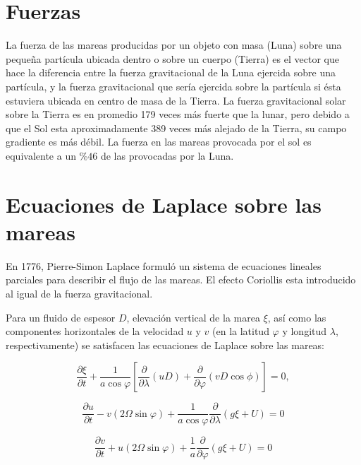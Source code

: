 \documentclass[12pt]{article}
\begin{document}
\section{Fuerzas}
La fuerza de las mareas producidas por un objeto con masa (Luna) sobre una pequeña partícula ubicada dentro o sobre un cuerpo (Tierra) es el vector que hace la diferencia entre la fuerza gravitacional de la Luna ejercida sobre una partícula, y la fuerza gravitacional que sería ejercida sobre la partícula si ésta estuviera ubicada en centro de masa de la Tierra. La fuerza gravitacional solar sobre la Tierra es en promedio 179 veces más fuerte que la lunar, pero debido a que el Sol esta aproximadamente 389 veces más alejado de la Tierra, su campo gradiente es más débil. La fuerza en las mareas provocada por el sol es equivalente a un $\%46$ de las provocadas por la Luna. 


\section{Ecuaciones de Laplace sobre las mareas}
En 1776, Pierre-Simon Laplace formuló un sistema de ecuaciones lineales parciales para describir el flujo de las mareas. El efecto Coriollis esta introducido al igual de la fuerza gravitacional. 

Para un fluido de espesor $D$, elevación vertical de la marea $\xi$, así como las componentes horizontales de la velocidad $u$ y $v$ (en la latitud $\varphi$ y longitud $\lambda$, respectivamente) se satisfacen las ecuaciones de Laplace sobre las mareas:


	\begin{equation}
	\frac{\partial					\xi}{\partial{t}}+\frac{1}		{a\cos{\varphi}}				\left[\frac{\partial}			{\partial \lambda}				(uD)+\frac{\partial}			{\partial	 \varphi}			(vD\cos{\phi}) \right]=0,
	\end{equation}
    
    \begin{equation}
	\frac{\partial					u}{\partial{t}}-v(2\Omega		\sin{\varphi})+\frac{1}			{a\cos{\varphi}}				\frac{\partial}					{\partial \lambda}(g\xi+U)=0
	\end{equation}
    
    \begin{equation}
	\frac{\partial					v}{\partial{t}}+u(2\Omega		\sin{\varphi})+\frac{1}			{a}\frac{\partial}				{\partial \varphi}(g\xi+U)=0
	\end{equation}
    \vspace{1cm}
\end{document}
